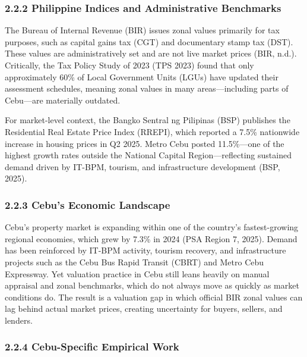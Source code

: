 \subsubsection{\texorpdfstring{\textbf{2.2.2 Philippine Indices and Administrative Benchmarks}}{2.2.2 Philippine Indices and Administrative Benchmarks}}\label{philippine-indices-and-administrative-benchmarks}

The Bureau of Internal Revenue (BIR) issues zonal values primarily for tax purposes, such as capital gains tax (CGT) and documentary stamp tax (DST). These values are administratively set and are not live market prices (BIR, n.d.). Critically, the Tax Policy Study of 2023 (TPS 2023) found that only approximately 60\% of Local Government Units (LGUs) have updated their assessment schedules, meaning zonal values in many areas---including parts of Cebu---are materially outdated.

For market-level context, the Bangko Sentral ng Pilipinas (BSP) publishes the Residential Real Estate Price Index (RREPI), which reported a 7.5\% nationwide increase in housing prices in Q2 2025. Metro Cebu posted 11.5\%---one of the highest growth rates outside the National Capital Region---reflecting sustained demand driven by IT-BPM, tourism, and infrastructure development (BSP, 2025).

\subsubsection{\texorpdfstring{\textbf{2.2.3 Cebu's Economic Landscape}}{2.2.3 Cebu's Economic Landscape}}\label{cebus-economic-landscape}

Cebu's property market is expanding within one of the country's fastest-growing regional economies, which grew by 7.3\% in 2024 (PSA Region 7, 2025). Demand has been reinforced by IT-BPM activity, tourism recovery, and infrastructure projects such as the Cebu Bus Rapid Transit (CBRT) and Metro Cebu Expressway. Yet valuation practice in Cebu still leans heavily on manual appraisal and zonal benchmarks, which do not always move as quickly as market conditions do. The result is a valuation gap in which official BIR zonal values can lag behind actual market prices, creating uncertainty for buyers, sellers, and lenders.

\subsubsection{\texorpdfstring{\textbf{2.2.4 Cebu-Specific Empirical Work}}{2.2.4 Cebu-Specific Empirical Work}}\label{cebu-specific-empirical-work}

